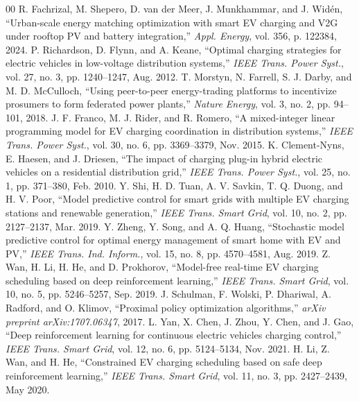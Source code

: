\documentclass[journal]{IEEEtran}
\theoremstyle{remark}
\begin{document}
\begin{thebibliography}{00}
 R. Fachrizal, M. Shepero, D. van der Meer, J. Munkhammar, and J. Wid\'{e}n, ``Urban-scale energy matching optimization with smart EV charging and V2G under rooftop PV and battery integration,'' \textit{Appl. Energy}, vol. 356, p. 122384, 2024.
 P. Richardson, D. Flynn, and A. Keane, ``Optimal charging strategies for electric vehicles in low-voltage distribution systems,'' \textit{IEEE Trans. Power Syst.}, vol. 27, no. 3, pp. 1240--1247, Aug. 2012.
 T. Morstyn, N. Farrell, S. J. Darby, and M. D. McCulloch, ``Using peer-to-peer energy-trading platforms to incentivize prosumers to form federated power plants,'' \textit{Nature Energy}, vol. 3, no. 2, pp. 94--101, 2018.
 J. F. Franco, M. J. Rider, and R. Romero, ``A mixed-integer linear programming model for EV charging coordination in distribution systems,'' \textit{IEEE Trans. Power Syst.}, vol. 30, no. 6, pp. 3369--3379, Nov. 2015.
 K. Clement-Nyns, E. Haesen, and J. Driesen, ``The impact of charging plug-in hybrid electric vehicles on a residential distribution grid,'' \textit{IEEE Trans. Power Syst.}, vol. 25, no. 1, pp. 371--380, Feb. 2010.
 Y. Shi, H. D. Tuan, A. V. Savkin, T. Q. Duong, and H. V. Poor, ``Model predictive control for smart grids with multiple EV charging stations and renewable generation,'' \textit{IEEE Trans. Smart Grid}, vol. 10, no. 2, pp. 2127--2137, Mar. 2019.
 Y. Zheng, Y. Song, and A. Q. Huang, ``Stochastic model predictive control for optimal energy management of smart home with EV and PV,'' \textit{IEEE Trans. Ind. Inform.}, vol. 15, no. 8, pp. 4570--4581, Aug. 2019.
 Z. Wan, H. Li, H. He, and D. Prokhorov, ``Model-free real-time EV charging scheduling based on deep reinforcement learning,'' \textit{IEEE Trans. Smart Grid}, vol. 10, no. 5, pp. 5246--5257, Sep. 2019.
 J. Schulman, F. Wolski, P. Dhariwal, A. Radford, and O. Klimov, ``Proximal policy optimization algorithms,'' \textit{arXiv preprint arXiv:1707.06347}, 2017.
 L. Yan, X. Chen, J. Zhou, Y. Chen, and J. Gao, ``Deep reinforcement learning for continuous electric vehicles charging control,'' \textit{IEEE Trans. Smart Grid}, vol. 12, no. 6, pp. 5124--5134, Nov. 2021.
 H. Li, Z. Wan, and H. He, ``Constrained EV charging scheduling based on safe deep reinforcement learning,'' \textit{IEEE Trans. Smart Grid}, vol. 11, no. 3, pp. 2427--2439, May 2020.

\end{thebibliography}
\end{document}
